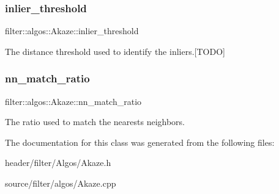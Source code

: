 \subsubsection{\texorpdfstring{inlier\+\_\+threshold}{inlier\_threshold}}
{\footnotesize\ttfamily filter\+::algos\+::\+Akaze\+::inlier\+\_\+threshold}

The distance threshold used to identify the inliers.\mbox{[}T\+O\+DO\mbox{]} \mbox{\label{classfilter_1_1algos_1_1_akaze_a114bb2fea06317e4b7c5ba620dd8d3c4}} 
\subsubsection{\texorpdfstring{nn\+\_\+match\+\_\+ratio}{nn\_match\_ratio}}
{\footnotesize\ttfamily filter\+::algos\+::\+Akaze\+::nn\+\_\+match\+\_\+ratio}

The ratio used to match the nearests neighbors. 

The documentation for this class was generated from the following files\+:\begin{DoxyCompactItemize}
\item 
header/filter/\+Algos/Akaze.\+h\item 
source/filter/algos/Akaze.\+cpp\end{DoxyCompactItemize}
